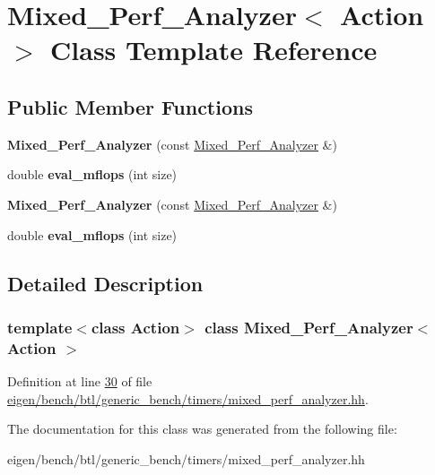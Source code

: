 \hypertarget{class_mixed___perf___analyzer}{}\section{Mixed\+\_\+\+Perf\+\_\+\+Analyzer$<$ Action $>$ Class Template Reference}
\label{class_mixed___perf___analyzer}
\subsection*{Public Member Functions}
\begin{DoxyCompactItemize}
\item 
\mbox{\label{class_mixed___perf___analyzer_aabfa0b3e7e95f218fd122455d9370a37}} 
{\bfseries Mixed\+\_\+\+Perf\+\_\+\+Analyzer} (const \hyperlink{class_mixed___perf___analyzer}{Mixed\+\_\+\+Perf\+\_\+\+Analyzer} \&)
\item 
\mbox{\label{class_mixed___perf___analyzer_a44e25f370018dd43db2cd4271634aac5}} 
double {\bfseries eval\+\_\+mflops} (int size)
\item 
\mbox{\label{class_mixed___perf___analyzer_aabfa0b3e7e95f218fd122455d9370a37}} 
{\bfseries Mixed\+\_\+\+Perf\+\_\+\+Analyzer} (const \hyperlink{class_mixed___perf___analyzer}{Mixed\+\_\+\+Perf\+\_\+\+Analyzer} \&)
\item 
\mbox{\label{class_mixed___perf___analyzer_a44e25f370018dd43db2cd4271634aac5}} 
double {\bfseries eval\+\_\+mflops} (int size)
\end{DoxyCompactItemize}


\subsection{Detailed Description}
\subsubsection*{template$<$class Action$>$\newline
class Mixed\+\_\+\+Perf\+\_\+\+Analyzer$<$ Action $>$}



Definition at line \hyperlink{eigen_2bench_2btl_2generic__bench_2timers_2mixed__perf__analyzer_8hh_source_l00030}{30} of file \hyperlink{eigen_2bench_2btl_2generic__bench_2timers_2mixed__perf__analyzer_8hh_source}{eigen/bench/btl/generic\+\_\+bench/timers/mixed\+\_\+perf\+\_\+analyzer.\+hh}.



The documentation for this class was generated from the following file\+:\begin{DoxyCompactItemize}
\item 
eigen/bench/btl/generic\+\_\+bench/timers/mixed\+\_\+perf\+\_\+analyzer.\+hh\end{DoxyCompactItemize}
